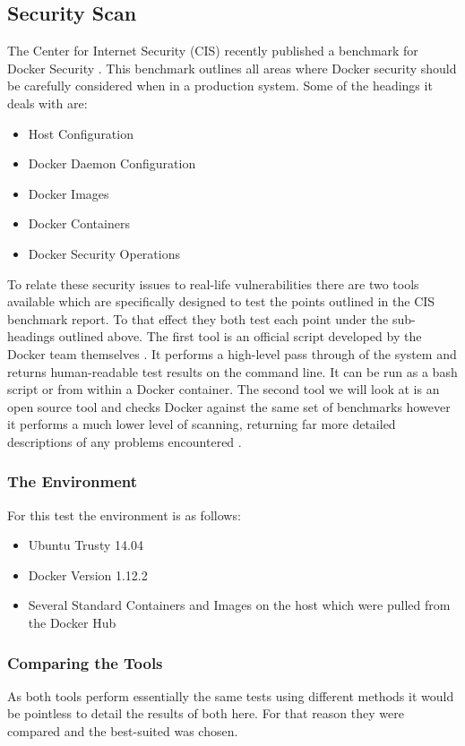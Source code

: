 \documentclass{article}
\begin{document}
\subsection{Security Scan}
\label{sub:scan}
The Center for Internet Security (CIS) recently published a benchmark for Docker Security \citep{CenterofInternetSecurity2016}. This benchmark outlines all areas where Docker security should be carefully considered when in a production system. Some of the headings it deals with are:

\begin{itemize}
  \item Host Configuration
  \item Docker Daemon Configuration
  \item Docker Images 
  \item Docker Containers
  \item Docker Security Operations
\end{itemize}

To relate these security issues to real-life vulnerabilities there are two tools available which are specifically designed to test the points outlined in the CIS benchmark report. To that effect they both test each point under the sub-headings outlined above. The first tool is an official script developed by the Docker team themselves \citep{DockerRepo2016}. It performs a high-level pass through of the system and returns human-readable test results on the command line. It can be run as a bash script or from within a Docker container. The second tool we will look at is an open source tool and checks Docker against the same set of benchmarks however it performs a much lower level of scanning, returning far more detailed descriptions of any problems encountered \citep{Ledenev2016}.

\subsubsection{The Environment}
For this test the environment is as follows:

\begin{itemize}
  \item Ubuntu Trusty 14.04
  \item Docker Version 1.12.2
  \item Several Standard Containers and Images on the host which were pulled from the Docker Hub
\end{itemize}

\subsubsection{Comparing the Tools}
As both tools perform essentially the same tests using different methods it would be pointless to detail the results of both here. For that reason they were compared and the best-suited was chosen.
\end{document}
